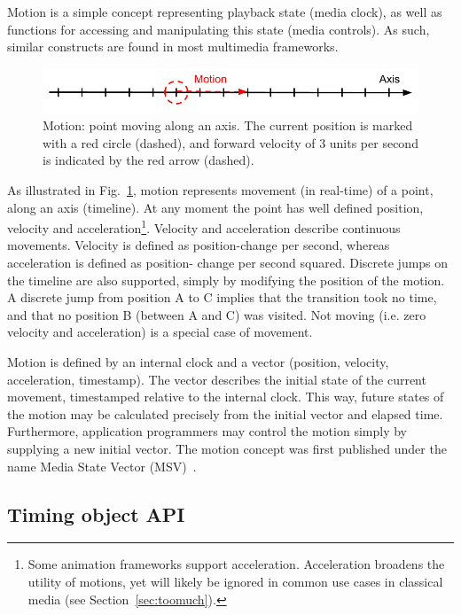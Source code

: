 Motion is a simple concept representing playback state (media clock), as well
as functions for accessing and manipulating this state (media controls). As
such, similar constructs are found in most multimedia frameworks.

\begin{figure}[h]
\centering
\includegraphics[scale=.4]{fig/motion-axis.png}
\caption{Motion: point moving along an axis. The current position
is marked with a red circle (dashed), and forward velocity of 3 units per second is
indicated by the red arrow (dashed).}
\label{fig:motion}
\end{figure}

As illustrated in Fig.~\ref{fig:motion}, motion represents movement (in real-time)
of a point, along an axis (timeline). At any moment the point has well
defined position, velocity and acceleration\footnote{Some animation frameworks
support acceleration. Acceleration broadens the utility of motions, yet will
likely be ignored in common use cases in classical media (see
Section~\ref{sec:toomuch}).}. Velocity and acceleration describe continuous
movements. Velocity is defined as position-change per second, whereas
acceleration is defined as position- change per second squared. Discrete jumps
on the timeline are also supported, simply by modifying the position of the
motion. A discrete jump from position A to C implies that the transition took
no time, and that no position B (between A and C) was visited. Not moving
(i.e. zero velocity and acceleration) is a special case of movement.

\label{sec:internalstate}
Motion is defined by an internal clock and a vector (position, velocity,
acceleration, timestamp). The vector describes the initial state of the
current movement, timestamped relative to the internal clock. This way, future
states of the motion may be calculated precisely from the initial vector and
elapsed time. Furthermore, application programmers may control the motion
simply by supplying a new initial vector. The motion concept was first
published under the name Media State Vector (MSV)~\cite{msv}.


\subsection{Timing object API}
\label{sec:motionapi}

